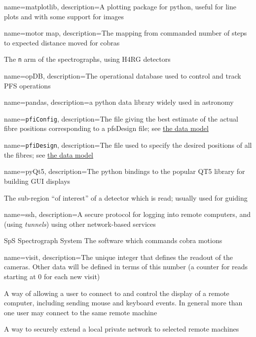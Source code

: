 
{
  name={matplotlib},
  description={A plotting package for python, useful for line plots and with some support for images}
}

{
  name={motor map},
  description={The mapping from commanded number of steps to expected distance moved for cobras}
}

{The \texttt{n} arm of the \PFS spectrographs, using \gls{H4RG} detectors}

{
  name={opDB},
  description={The operational database used to control and track \gls{PFS} operations}
}

{
  name={pandas},
  description={a python data library widely used in astronomy}
}

{
  name={\texttt{pfiConfig}},
  description={The file giving the best estimate of the actual fibre positions corresponding to
  a \gls{pfsDesign} file;
  see \href{https://github.com/Subaru-PFS/datamodel/blob/master/datamodel.txt}{the data model}}
}

{
  name={\texttt{pfiDesign}},
  description={The file used to specify the desired positions of all the fibres;
  see \href{https://github.com/Subaru-PFS/datamodel/blob/master/datamodel.txt}{the data model}}
}


{
  name={pyQt5},
  description={The python bindings to the popular QT5 library for building GUI displays}
}

{The sub-region ``of interest'' of a detector which is read;  usually used for guiding}


{
  name={ssh},
  description={A secure protocol for logging into remote computers, and (using \textit{tunnels})
    using other network-based services}
}

{SpS}
{Spectrograph System}
{The software which commands cobra motions}



{
  name={visit},
  description={The unique integer that defines the readout of the \SPS cameras.  Other data
  will be defined in terms of this number (\eg a counter for \AGC reads starting at 0 for
  each new \gls{visit})}
}

{A way of allowing a user to connect to and control the display of a remote computer, including sending
mouse and keyboard events.  In general more than one user may connect to the same remote machine}

{A way to securely extend a local private network to selected remote machines}
